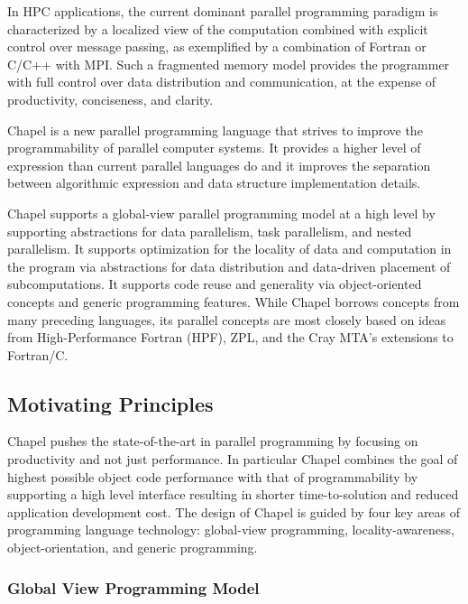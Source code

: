 \label{Language_Overview}

In HPC applications, the current dominant parallel programming paradigm 
is characterized by a localized
view of the computation combined with explicit control
over message passing, as exemplified by a combination
of Fortran or C/C++ with MPI. Such a fragmented memory
model provides the programmer with full control over data
distribution and communication, at the expense of productivity,
conciseness, and clarity.

Chapel is a new parallel programming language that 
strives to improve the programmability of parallel computer systems.
It provides a higher level of expression 
than current parallel languages do and it improves the separation between 
algorithmic expression and data structure implementation details. 

Chapel supports a global-view parallel programming model at a high level by 
supporting abstractions for data parallelism, task parallelism, and nested parallelism. 
It supports optimization for the locality of data and computation in the program 
via abstractions for data distribution and data-driven placement of subcomputations. 
It supports code reuse and generality via object-oriented concepts and generic 
programming features. While Chapel borrows concepts from many preceding languages, 
its parallel concepts are most closely based on ideas from High-Performance Fortran 
(HPF), ZPL, and the Cray MTA's extensions to Fortran/C. 

\subsection{Motivating Principles}
\label{Motivating_Principles}

Chapel pushes the state-of-the-art in parallel programming
by focusing on productivity and not just performance. In particular
Chapel combines the goal of highest possible
object code performance with that of programmability
by supporting a high level interface resulting in
shorter time-to-solution and reduced application development
cost. The design of Chapel is guided by four key
areas of programming language technology: global-view programming,
locality-awareness, object-orientation, and generic
programming.

\subsubsection{Global View Programming Model}
\label{Global_View_Programming_Model}

